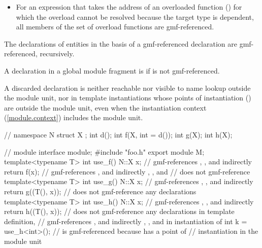 \begin{std.txt}
\begin{itemize}
\begin{ncsimplebnf}
postfix-expression \terminal{(} expression-list\opt{} \terminal{)}
\end{ncsimplebnf}
whose  denotes a dependent name,
or for an operator expression whose operator denotes a dependent name,
consider an expression synthesized from it
by replacing each type-dependent argument or operand
with a value of a placeholder type
with no associated namespaces or entities.
All declarations found by name lookup
for the corresponding name
in the synthesized expression are gmf-referenced.
\item
For an expression that takes the address of an overloaded function ()
for which the overload cannot be resolved because the target type is dependent,
all members of the set of overload functions are gmf-referenced.
\end{itemize}
The declarations of entities in the basis of a gmf-referenced declaration are gmf-referenced, recursively.

\pnum
A declaration  in a global module fragment is  if 
is not gmf-referenced.
\begin{note}
A discarded declaration is neither reachable
nor visible to name lookup outside the module unit,
nor in template instantiations whose points of instantiation
() are outside the module unit,
even when the instantiation context (\ref{module.context})
includes the module unit.
\end{note}

\pnum
\begin{example}
\begin{codeblock}
// 
namespace N {
  struct X {};
  int d();
  int f(X, int = d());
  int g(X);
  int h(X);
}

// module  interface
module;
#include "foo.h"
export module M;
template<typename T> int use_f() {
  N::X x;                    // gmf-references , , and indirectly \tcode{::}
  return f(x);               // gmf-references , and indirectly , , and \tcode{::}
                             // does not gmf-reference 
}
template<typename T> int use_g() {
  N::X x;                    // gmf-references , , and indirectly \tcode{::}
  return g((T(), x));        // does not gmf-reference any declarations
}
template<typename T> int use_h() {
  N::X x;                    // gmf-references , , and indirectly \tcode{::}
  return h((T(), x));        // does not gmf-reference any declarations in template definition, 
                             // gmf-references , and indirectly , , and \tcode{::} in instantiation of 
}
int k = use_h<int>();
  //  is gmf-referenced because  has a point of
  // instantiation in the module unit 


\end{codeblock}
\end{example}
\end{std.txt}

